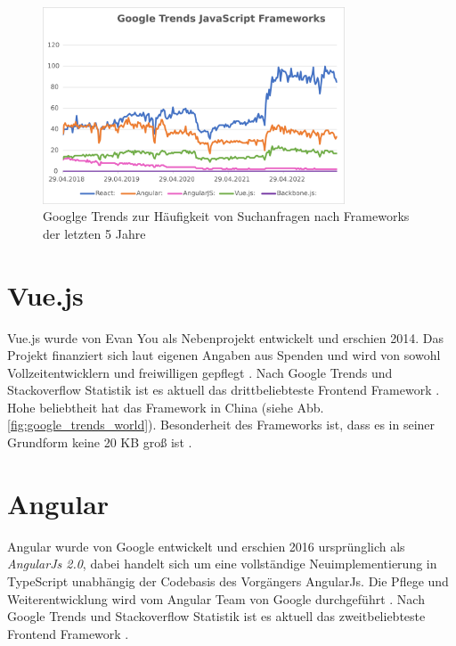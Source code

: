 \begin{figure}[!htb]
    \centering
    \includegraphics[width=0.8\textwidth]{img/Google Stats/google_frameworks_trends}
    \caption{Googlge Trends zur Häufigkeit von Suchanfragen nach Frameworks der letzten 5 Jahre \cite{googleTrends}}
    \label{fig:google_trends}
\end{figure}


\section{Vue.js}
Vue.js wurde von Evan You als Nebenprojekt entwickelt und erschien 2014.
Das Projekt finanziert sich laut eigenen Angaben aus Spenden und
wird von sowohl Vollzeitentwicklern und freiwilligen gepflegt \cite{vueFAQ}.
Nach Google Trends und Stackoverflow Statistik ist es aktuell das drittbeliebteste
Frontend Framework \cite{googleTrends} \cite{stackoverflowStats}.
Hohe beliebtheit hat das Framework in China (siehe Abb.\ref{fig:google_trends_world}).
Besonderheit des Frameworks ist, dass es in seiner Grundform keine 20 KB groß ist \cite[S. 523]{bin2019}.


\section{Angular}
Angular wurde von Google entwickelt und erschien 2016 ursprünglich als \emph{AngularJs 2.0},
dabei handelt sich um eine vollständige Neuimplementierung in TypeScript unabhängig der Codebasis des Vorgängers AngularJs.
Die Pflege und Weiterentwicklung wird vom Angular Team von Google durchgeführt \cite[S. 209-210]{bin2019}.
Nach Google Trends und Stackoverflow Statistik ist es aktuell das zweitbeliebteste
Frontend Framework \cite{googleTrends} \cite{stackoverflowStats}.

\newpage

